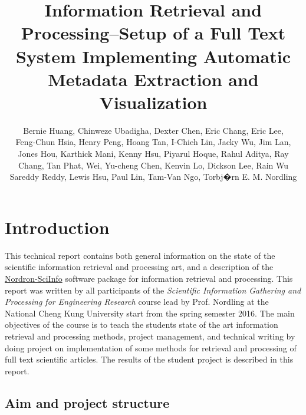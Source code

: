 \documentclass[a4paper,twocolumn,twoside]{article}
\begin{document}
 
	
	\title{Information Retrieval and Processing--Setup of a Full Text System Implementing Automatic Metadata Extraction and Visualization}
	\author{Bernie Huang, Chinweze Ubadigha, Dexter Chen, Eric Chang, Eric Lee, \\
		Feng-Chun Hsia, Henry Peng, Hoang Tan, I-Chieh Lin, Jacky Wu, Jim Lan, \\
		Jones Hou, Karthick Mani, Kenny Hsu, Piyarul Hoque, Rahul Aditya, Ray \\
		Chang, Tan Phat, Wei, Yu-cheng Chen, Kenvin Lo, Dickson Lee, Rain Wu\\
		 Sareddy Reddy, Lewis Hsu, Paul Lin, Tam-Van Ngo, Torbj�rn E. M. Nordling}  %
	\maketitle   
	
	\section{Introduction}
	\label{Introduction}
	
	This technical report contains both general information on the state of the scientific information retrieval and processing art, and a description of the \href{https://bitbucket.org/nordron/nordron-sciinfo}{Nordron-SciInfo} software package for information retrieval and processing. 
	This report was written by all participants of the \emph{Scientific Information Gathering and Processing for Engineering Research} course lead by Prof. Nordling at the National Cheng Kung University start from the spring semester 2016.
	The main objectives of the course is to teach the students state of the art information retrieval and processing methods, project management, and technical writing by doing project on implementation of some methods for retrieval and processing of full text scientific articles.
	The results of the student project is described in this report.
	
	\subsection{Aim and project structure}
	\label{aim}

	
\end{document}

